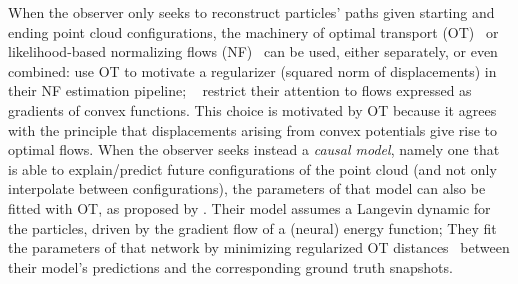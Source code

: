 When the observer only seeks to reconstruct particles' paths given starting and ending point cloud configurations, the machinery of optimal transport (OT)~\citep{schiebinger2019optimal,yang2020predicting,yang2018scalable} or likelihood-based normalizing flows (NF)~\citep{rezende2015variational,grathwohl2018ffjord} can be used, either separately, or even combined: \citet{tong2020trajectorynet} use OT to motivate a regularizer (squared norm of displacements) in their NF estimation pipeline; ~\citet{huang2021convex} restrict their attention to flows expressed as gradients of convex functions. This choice is motivated by OT because it agrees with the \citet{brenier1987decomposition} principle that displacements arising from convex potentials give rise to optimal flows.
When the observer seeks instead a \textit{causal model}, namely one that is able to explain/predict future configurations of the point cloud (and not only interpolate between configurations), the parameters of that model can also be fitted with OT, as proposed by \citet{hashimoto2016learning}. Their model assumes a Langevin dynamic for the particles, driven by the gradient flow of a (neural) energy function; They fit the parameters of that network by minimizing regularized OT distances~\citep{cuturi2013sinkhorn} between their model's predictions and the corresponding ground truth snapshots. %

